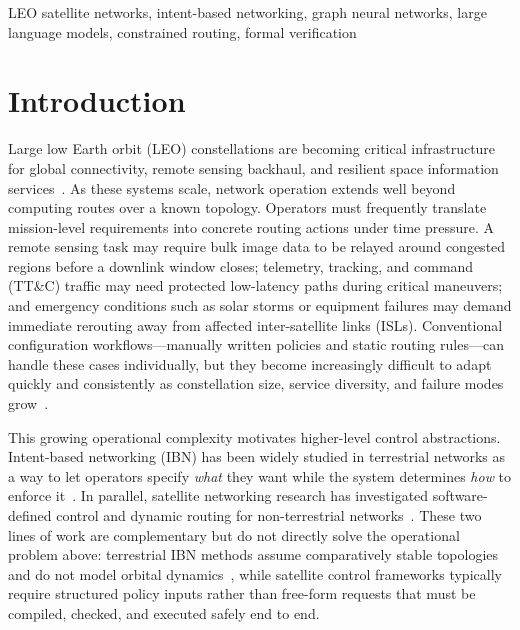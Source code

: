 \documentclass[10pt, conference, letterpaper]{IEEEtran}
\begin{document}
\begin{IEEEkeywords}
LEO satellite networks, intent-based networking, graph neural networks,
large language models, constrained routing, formal verification
\end{IEEEkeywords}

\section{Introduction}
\label{sec:intro}

Large low Earth orbit (LEO) constellations are becoming critical
infrastructure for global connectivity, remote sensing backhaul,
and resilient space information services~\cite{leo_constellation_survey}.
As these systems scale, network operation extends well beyond
computing routes over a known topology. Operators must frequently
translate mission-level requirements into concrete routing actions
under time pressure. A remote sensing task may require bulk image
data to be relayed around congested regions before a downlink window
closes; telemetry, tracking, and command (TT\&C) traffic may need
protected low-latency paths during critical maneuvers; and emergency
conditions such as solar storms or equipment failures may demand
immediate rerouting away from affected inter-satellite links (ISLs).
Conventional configuration workflows---manually written policies and
static routing rules---can handle these cases individually, but they
become increasingly difficult to adapt quickly and consistently as
constellation size, service diversity, and failure modes
grow~\cite{satnet_ops}.

This growing operational complexity motivates higher-level control
abstractions. Intent-based networking (IBN) has been widely studied
in terrestrial networks as a way to let operators specify \emph{what}
they want while the system determines \emph{how} to enforce
it~\cite{ibn_survey,ibn_framework}. In parallel, satellite networking
research has investigated software-defined control and dynamic routing
for non-terrestrial networks~\cite{satellite_sdn_survey,leo_routing_survey}.
These two lines of work are complementary but do not directly solve
the operational problem above: terrestrial IBN methods assume
comparatively stable topologies and do not model orbital
dynamics~\cite{ibn_template,ibn_ontology}, while satellite control
frameworks typically require structured policy inputs rather than
free-form requests that must be compiled, checked, and executed
safely end to end.
\end{document}
